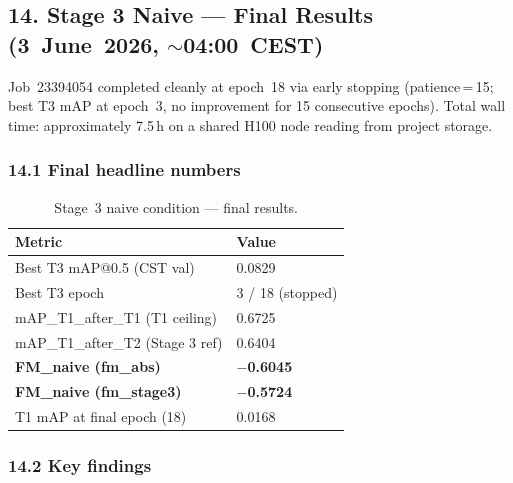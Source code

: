 \subsection*{14. Stage 3 Naive — Final Results (3~June~2026, $\sim$04:00~CEST)}

Job~23394054 completed cleanly at epoch~18 via early stopping
(patience\,=\,15; best T3 mAP at epoch~3, no improvement for 15
consecutive epochs). Total wall time: approximately 7.5\,h on a
shared H100 node reading from project storage.

\subsubsection*{14.1 Final headline numbers}

\begin{table}[h]
\centering
\caption{Stage~3 naive condition — final results.}
\label{tab:s3_naive_final}
\small
\begin{tabular}{ll}
\hline
\textbf{Metric} & \textbf{Value} \\
\hline
Best T3 mAP@0.5 (CST val)         & 0.0829 \\
Best T3 epoch                      & 3 / 18 (stopped) \\
mAP\_T1\_after\_T1 (T1 ceiling)   & 0.6725 \\
mAP\_T1\_after\_T2 (Stage 3 ref)  & 0.6404 \\
\textbf{FM\_naive (fm\_abs)}       & \textbf{$-$0.6045} \\
\textbf{FM\_naive (fm\_stage3)}    & \textbf{$-$0.5724} \\
T1 mAP at final epoch (18)         & 0.0168 \\
\hline
\end{tabular}
\end{table}

\subsubsection*{14.2 Key findings}

